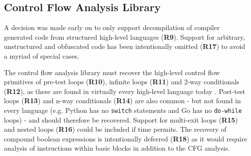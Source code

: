 
\subsection{Control Flow Analysis Library}
\label{sec:req_control_flow_analysis_library}

A decision was made early on to only support decompilation of compiler generated code from structured high-level languages (\textbf{R9}). Support for arbitrary, unstructured and obfuscated code has been intentionally omitted (\textbf{R17}) to avoid a myriad of special cases.

The control flow analysis library must recover the high-level control flow primitives of pre-test loops (\textbf{R10}), infinite loops (\textbf{R11}) and 2-way conditionals (\textbf{R12}), as these are found in virtually every high-level language today \cite{reverse_comp}. Post-test loops (\textbf{R13}) and n-way conditionals (\textbf{R14}) are also common - but not found in every language (e.g. Python has no \texttt{switch} statements and Go has no \texttt{do-while} loops) - and should therefore be recovered. Support for multi-exit loops (\textbf{R15}) and nested loops (\textbf{R16}) could be included if time permits. The recovery of compound boolean expressions is intentionally deferred (\textbf{R18}) as it would require analysis of instructions within basic blocks in addition to the CFG analysis.

